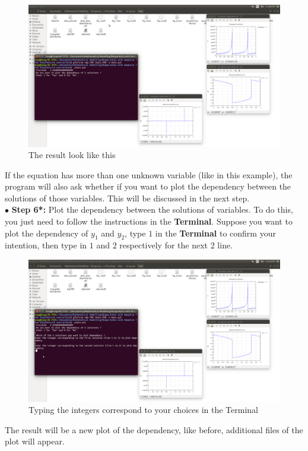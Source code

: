 \documentclass[a4paper,oneside]{book}
\numberwithin{equation}{chapter}
\begin{document}
	\begin{figure}[H]
		\centering	\includegraphics[width=15cm]{fig8}
		\caption{The result look like this}
	\end{figure}
	\noindent If the equation has more than one unknown variable (like in this example), the program will also ask whether if you want to plot the dependency between the solutions of those variables. This will be discussed in the next step.\\
	\noindent$\bullet$ \textbf{Step 6*:} Plot the dependency between the solutions of variables. To do this, you just need to follow the instructions in the \textbf{Terminal}. Suppose you want to plot the dependency of $y_1$ and $y_2$, type $1$ in the \textbf{Terminal} to confirm your intention, then type in $1$ and $2$ respectively for the next $2$ line.\\
	\begin{figure}[H]
		\centering	\includegraphics[width=15cm]{fig9}
		\caption{Typing the integers correspond to your choices in the Terminal}
	\end{figure}
	\noindent The result will be a new plot of the dependency, like before, additional files of the plot will appear.
\end{document}
